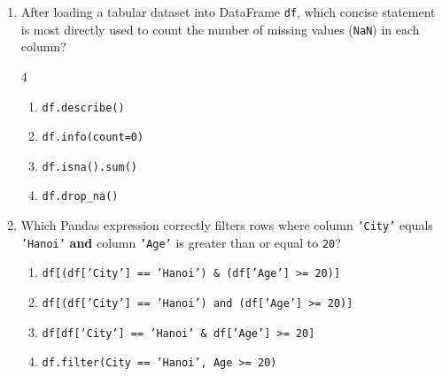 \documentclass[11pt,a4paper]{article}
\begin{document}
\begin{enumerate}[leftmargin=*,itemsep=2.5pt,resume]
\item After loading a tabular dataset into DataFrame \texttt{df}, which concise statement is most directly used to count the number of missing values (\texttt{NaN}) in each column?
\begin{multicols}{4}
\begin{enumerate}[label=\Alph*.]
  \item \texttt{df.describe()}
  \item \texttt{df.info(count=0)}
  \item \texttt{df.isna().sum()}
  \item \texttt{df.drop\_na()}
\end{enumerate}
\end{multicols}

\item Which Pandas expression correctly filters rows where column \texttt{'City'} equals \texttt{'Hanoi'} \textbf{and} column \texttt{'Age'} is greater than or equal to \texttt{20}?
\begin{enumerate}[label=\Alph*.]
  \item \texttt{df[(df['City'] == 'Hanoi') \& (df['Age'] >= 20)]}
  \item \texttt{df[(df['City'] == 'Hanoi') and (df['Age'] >= 20)]}
  \item \texttt{df[df['City'] == 'Hanoi' \& df['Age'] >= 20]}
  \item \texttt{df.filter(City == 'Hanoi', Age >= 20)}
\end{enumerate}

\end{enumerate}
\end{document}
